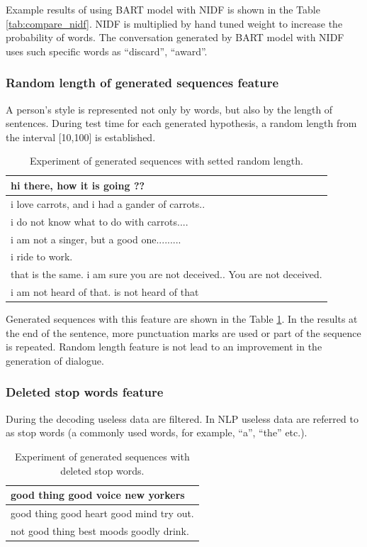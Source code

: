Example results of using BART model with NIDF is shown in the Table \ref{tab:compare_nidf}. NIDF is multiplied by hand tuned weight to increase the probability of words. The conversation generated by BART model with NIDF uses such specific words as ``discard'', ``award''.

\subsubsection{Random length of generated sequences feature}
A person's style is represented not only by words, but also by the length of sentences. During test time for each generated hypothesis, a random length from the interval [10,100] is established. 

\begin{table}[ht]
\centering
 \begin{tabular}{|p{14cm}|} 
 \hline\hline
  hi there, how it is going ?? \\
 \hline
  i love carrots, and i had a gander of carrots.. \\
 \hline
  i do not know what to do with carrots.... \\
 \hline 
  i am not a singer, but a good one.........\\
 \hline 
 i ride to work. \\
 \hline 
 that is the same. i am sure you are not deceived.. You are not deceived. \\
 \hline 
 i am not heard of that.  is not heard of that \\
 \hline\hline
 \end{tabular}
 \caption{Experiment of generated sequences with setted random length.}
\label{tab:random_len}
\end{table}
Generated sequences with this feature are shown in the Table \ref{tab:random_len}. In the results at the end of the sentence, more punctuation marks are used or part of the sequence is repeated. Random length feature is not lead to an improvement in the generation of dialogue.

\subsubsection{Deleted stop words feature}
During the decoding useless data are filtered. In NLP useless data are referred to as stop words (a commonly used words, for example, ``a'', ``the'' etc.). 

\begin{table}[ht]
\centering
 \begin{tabular}{|p{14cm}|} 
 \hline\hline
  good thing good voice new yorkers \\
 \hline
  good thing good heart good mind try out. \\
 \hline
  not good thing best moods goodly drink. \\
 \hline\hline
 \end{tabular}
 \caption{Experiment of generated sequences with deleted stop words.}
\label{tab:stop_words}
\end{table}

